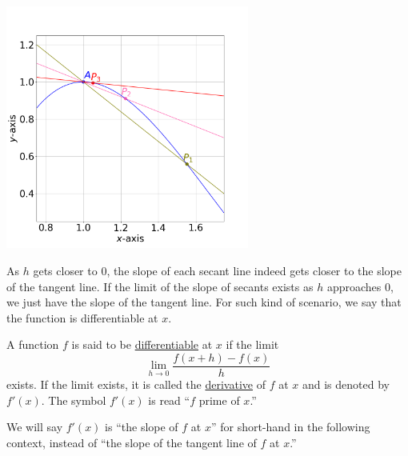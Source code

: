 \documentclass[11pt]{book}
\begin{document}
\begin{center}
    \includegraphics[width=0.6\textwidth]{sec_to_tan.png}
\end{center}

As $h$ gets closer to $0$, the slope of each secant line indeed gets closer to the slope of the tangent line. If the limit of the slope of secants exists as $h$ approaches $0$, we just have the slope of the tangent line. For such kind of scenario, we say that the function is differentiable at $x$.

\begin{definition}
    A function $f$ is said to be \underline{differentiable} at $x$ if the limit $$\lim_{h\to 0}\dfrac{f(x+h)-f(x)}{h}$$ exists. If the limit exists, it is called the \underline{derivative} of $f$ at $x$ and is denoted by $f'(x)$. The symbol $f'(x)$ is read ``$f$ prime of $x$.''
\end{definition}

\begin{remark}
    We will say $f'(x)$ is ``the slope of $f$ at $x$'' for short-hand in the following context, instead of ``the slope of the tangent line of $f$ at $x$.''
\end{remark}
\end{document}

